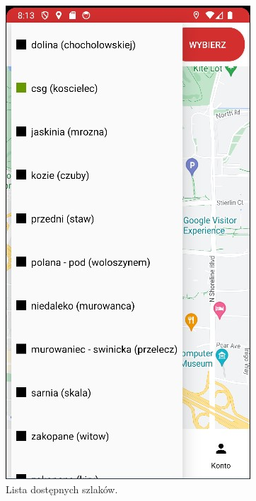\begin{figure}[H]
    \centering
    \includegraphics[scale=1.0]{img/imp/lista-szlakow.jpg}
    \caption{Lista dostępnych szlaków.}
    \label{widok:wyborszlaku}
\end{figure}

